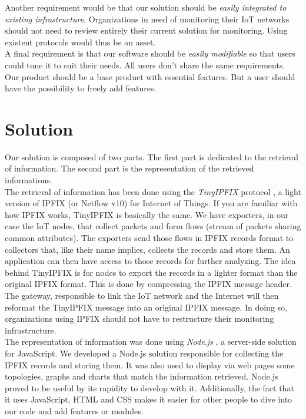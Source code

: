 Another requirement would be that our solution should be \textit{easily integrated to existing infrastructure}. Organizations in need of monitoring their IoT networks should not need to review entirely their current solution for monitoring. Using existent protocols would thus be an asset. \\

A final requirement is that our software should be \textit{easily modifiable} so that users could tune it to suit their needs. All users don't share the same requirements. Our product should be a base product with essential features. But a user should have the possibility to freely add features.

\section*{Solution}

Our solution is composed of two parts. The first part is dedicated to the retrieval of information. The second part is the representation of the retrieved informations. \\

The retrieval of information has been done using the \textit{TinyIPFIX} protocol \cite{schmitt2016tinyipfix}, a light version of IPFIX (or Netflow v10) for Internet of Things. If you are familiar with how IPFIX works, TinyIPFIX is basically the same. We have exporters, in our case the IoT nodes, that collect packets and form flows (stream of packets sharing common attributes). The exporters send those flows in IPFIX records format to collectors that, like their name implies, collects the records and store them. An application can then have access to those records for further analyzing. The idea behind TinyIPFIX is for nodes to export the records in a lighter format than the original IPFIX format. This is done by compressing the IPFIX message header. The gateway, responsible to link the IoT network and the Internet will then reformat the TinyIPFIX message into an original IPFIX message. In doing so, organizations using IPFIX should not have to restructure their monitoring infrastructure. \\

The representation of information was done using \textit{Node.js} \cite{website:nodejs}, a server-side solution for JavaScript. We developed a Node.js solution responsible for collecting the IPFIX records and storing them. It was also used to display via web pages some topologies, graphs and charts that match the information retrieved. Node.js proved to be useful by its rapidity to develop with it. Additionally, the fact that it uses JavaScript, HTML and CSS makes it easier for other people to dive into our code and add features or modules. \\

